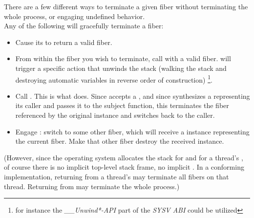 
There are a few different ways to terminate a given fiber without
terminating the whole process, or engaging undefined behavior.\\

%
Any of the following will gracefully terminate a fiber:

\begin{itemize}
    \item Cause its \entryfn to return a valid fiber.
    \item From within the fiber you wish to terminate, call \unwindfib with a
          valid fiber. \unwindfib will trigger a specific action that unwinds
          the stack (walking the stack and destroying automatic variables in
          reverse order of construction)
          \footnote{for instance the \emph{\_\_Unwind*-API} part of the
          \emph{SYSV ABI} could be utilized}.
    \item Call . This is what \dtor
          does. Since \unwindfib accepts a \fiber, and since \resumewith
          synthesizes a \fiber representing its caller and passes it to the
          subject function, this terminates the fiber referenced by the
          original \fiber instance and switches back to the caller.
    \item Engage \dtor: switch to some other fiber, which will
          receive a \fiber instance representing the current fiber. Make that
          other fiber destroy the received \fiber instance.
\end{itemize}

(However, since the operating system allocates the stack for \main and for a
thread's \entryfn, of course there is no implicit top-level stack frame, no
implicit . In a conforming implementation,
returning from a thread's \entryfn\xspace may terminate all fibers on that
thread. Returning from \main may terminate the whole process.)

